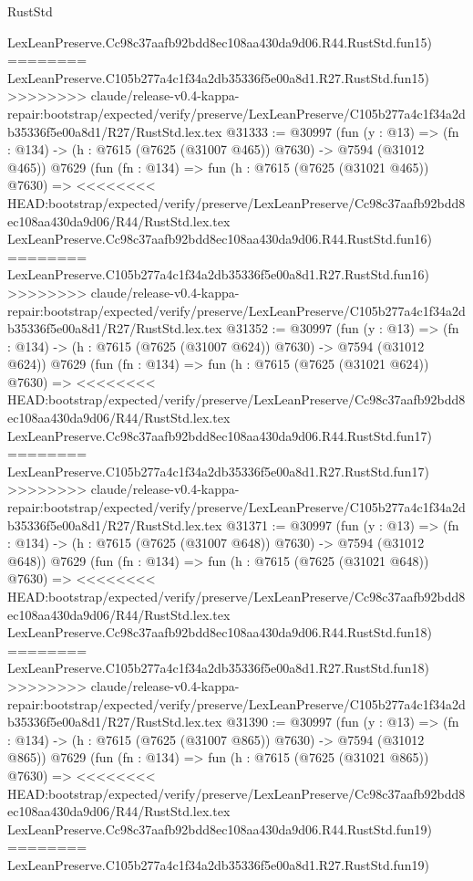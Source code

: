 \begin{lexlean}{RustStd}
\begin{coremodule}
{\begin{coremodule}
{{{{{{{{{{{{{{{{{{{{{{{{{{{{{{{{{{    LexLeanPreserve.Cc98c37aafb92bdd8ec108aa430da9d06.R44.RustStd.fun15)
========
    LexLeanPreserve.C105b277a4c1f34a2db35336f5e00a8d1.R27.RustStd.fun15)
>>>>>>>> claude/release-v0.4-kappa-repair:bootstrap/expected/verify/preserve/LexLeanPreserve/C105b277a4c1f34a2db35336f5e00a8d1/R27/RustStd.lex.tex
@31333 := @30997
    (fun (y : @13) => (fn : @134) -> (h : @7615 (@7625 (@31007 @465)) @7630) -> @7594 (@31012 @465))
    @7629
    (fun (fn : @134) =>
    fun (h : @7615 (@7625 (@31021 @465)) @7630) =>
<<<<<<<< HEAD:bootstrap/expected/verify/preserve/LexLeanPreserve/Cc98c37aafb92bdd8ec108aa430da9d06/R44/RustStd.lex.tex
    LexLeanPreserve.Cc98c37aafb92bdd8ec108aa430da9d06.R44.RustStd.fun16)
========
    LexLeanPreserve.C105b277a4c1f34a2db35336f5e00a8d1.R27.RustStd.fun16)
>>>>>>>> claude/release-v0.4-kappa-repair:bootstrap/expected/verify/preserve/LexLeanPreserve/C105b277a4c1f34a2db35336f5e00a8d1/R27/RustStd.lex.tex
@31352 := @30997
    (fun (y : @13) => (fn : @134) -> (h : @7615 (@7625 (@31007 @624)) @7630) -> @7594 (@31012 @624))
    @7629
    (fun (fn : @134) =>
    fun (h : @7615 (@7625 (@31021 @624)) @7630) =>
<<<<<<<< HEAD:bootstrap/expected/verify/preserve/LexLeanPreserve/Cc98c37aafb92bdd8ec108aa430da9d06/R44/RustStd.lex.tex
    LexLeanPreserve.Cc98c37aafb92bdd8ec108aa430da9d06.R44.RustStd.fun17)
========
    LexLeanPreserve.C105b277a4c1f34a2db35336f5e00a8d1.R27.RustStd.fun17)
>>>>>>>> claude/release-v0.4-kappa-repair:bootstrap/expected/verify/preserve/LexLeanPreserve/C105b277a4c1f34a2db35336f5e00a8d1/R27/RustStd.lex.tex
@31371 := @30997
    (fun (y : @13) => (fn : @134) -> (h : @7615 (@7625 (@31007 @648)) @7630) -> @7594 (@31012 @648))
    @7629
    (fun (fn : @134) =>
    fun (h : @7615 (@7625 (@31021 @648)) @7630) =>
<<<<<<<< HEAD:bootstrap/expected/verify/preserve/LexLeanPreserve/Cc98c37aafb92bdd8ec108aa430da9d06/R44/RustStd.lex.tex
    LexLeanPreserve.Cc98c37aafb92bdd8ec108aa430da9d06.R44.RustStd.fun18)
========
    LexLeanPreserve.C105b277a4c1f34a2db35336f5e00a8d1.R27.RustStd.fun18)
>>>>>>>> claude/release-v0.4-kappa-repair:bootstrap/expected/verify/preserve/LexLeanPreserve/C105b277a4c1f34a2db35336f5e00a8d1/R27/RustStd.lex.tex
@31390 := @30997
    (fun (y : @13) => (fn : @134) -> (h : @7615 (@7625 (@31007 @865)) @7630) -> @7594 (@31012 @865))
    @7629
    (fun (fn : @134) =>
    fun (h : @7615 (@7625 (@31021 @865)) @7630) =>
<<<<<<<< HEAD:bootstrap/expected/verify/preserve/LexLeanPreserve/Cc98c37aafb92bdd8ec108aa430da9d06/R44/RustStd.lex.tex
    LexLeanPreserve.Cc98c37aafb92bdd8ec108aa430da9d06.R44.RustStd.fun19)
========
    LexLeanPreserve.C105b277a4c1f34a2db35336f5e00a8d1.R27.RustStd.fun19)
}}}}}}}}}}}}}}}}}}}}}}}}}}}}}}}}}}
\end{coremodule}}
\end{coremodule}
\end{lexlean}
